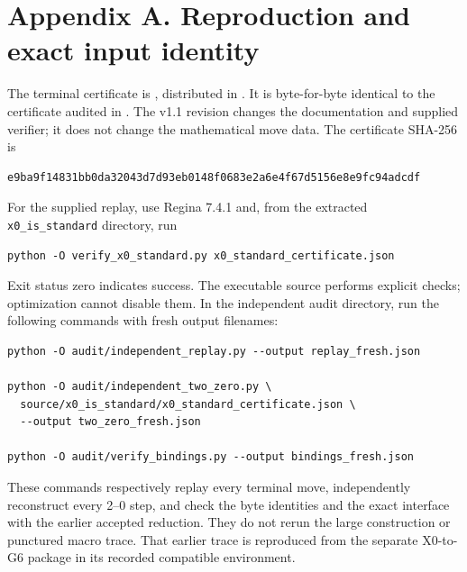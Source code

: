 \documentclass[11pt,letterpaper]{article}
\begin{document}
\section*{Appendix A. Reproduction and exact input identity}
The terminal certificate is , distributed in . It is byte-for-byte identical to the certificate audited in . The v1.1 revision changes the documentation and supplied verifier; it does not change the mathematical move data. The certificate SHA-256 is

\begin{Verbatim}
e9ba9f14831bb0da32043d7d93eb0148f0683e2a6e4f67d5156e8e9fc94adcdf
\end{Verbatim}
For the supplied replay, use Regina 7.4.1 and, from the extracted \texttt{x0\_is\_standard} directory, run

\begin{Verbatim}
python -O verify_x0_standard.py x0_standard_certificate.json
\end{Verbatim}
Exit status zero indicates success. The executable source performs explicit checks; optimization cannot disable them. In the independent audit directory, run the following commands with fresh output filenames:

\begin{Verbatim}
python -O audit/independent_replay.py --output replay_fresh.json

python -O audit/independent_two_zero.py \
  source/x0_is_standard/x0_standard_certificate.json \
  --output two_zero_fresh.json

python -O audit/verify_bindings.py --output bindings_fresh.json
\end{Verbatim}
These commands respectively replay every terminal move, independently reconstruct every 2--0 step, and check the byte identities and the exact interface with the earlier accepted reduction. They do not rerun the large construction or punctured macro trace. That earlier trace is reproduced from the separate X0-to-G6 package in its recorded compatible environment.
\end{document}
